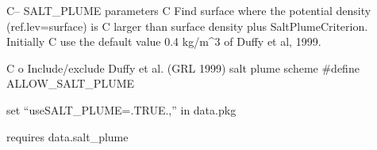 
C--   SALT_PLUME parameters
C     Find surface where the potential density (ref.lev=surface) is
C     larger than surface density plus SaltPlumeCriterion.  Initially
C     use the default value 0.4 kg/m^3 of Duffy et al, 1999.

C o Include/exclude Duffy et al. (GRL 1999) salt plume scheme
#define ALLOW_SALT_PLUME

set ``useSALT_PLUME=.TRUE.,'' in data.pkg

requires data.salt_plume
